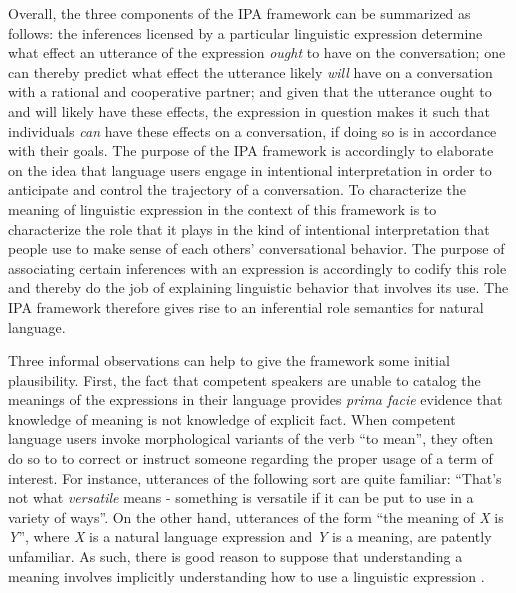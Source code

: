 Overall, the three components of the IPA framework can be summarized as follows: the inferences licensed by a particular linguistic expression determine what effect an utterance of the expression \textit{ought} to have on the conversation; one can thereby predict what effect the utterance likely \textit{will} have on a conversation with a rational and cooperative partner; and given that the utterance ought to and will likely have these effects, the expression in question makes it such that individuals \textit{can} have these effects on a conversation, if doing so is in accordance with their goals. The purpose of the IPA framework is accordingly to elaborate on the idea that language users engage in intentional interpretation in order to anticipate and control the trajectory of a conversation. To characterize the meaning of linguistic expression in the context of this framework is to characterize the role that it plays in the kind of intentional interpretation that people use to make sense of each others' conversational behavior. The purpose of associating certain inferences with an expression is accordingly to codify this role and thereby do the job of explaining linguistic behavior that involves its use. The IPA framework therefore gives rise to an inferential role semantics for natural language. 

Three informal observations can help to give the framework some initial plausibility. First, the fact that competent speakers are unable to catalog the meanings of the expressions in their language provides \textit{prima facie} evidence that knowledge of meaning is not knowledge of explicit fact. When competent language users invoke morphological variants of the verb ``to mean'', they often do so to to correct or instruct someone regarding the proper usage of a term of interest. For instance, utterances of the following sort are quite familiar: ``That's not what \textit{versatile} means - something is versatile if it can be put to use in a variety of ways''. On the other hand, utterances of the form ``the meaning of \textit{X} is \textit{Y}'', where \textit{X} is a natural language expression and \textit{Y} is a meaning, are patently unfamiliar. As such, there is good reason to suppose that understanding a meaning involves implicitly understanding how to use a linguistic expression \citep{Brandom:1994,Horwich:2005}.

